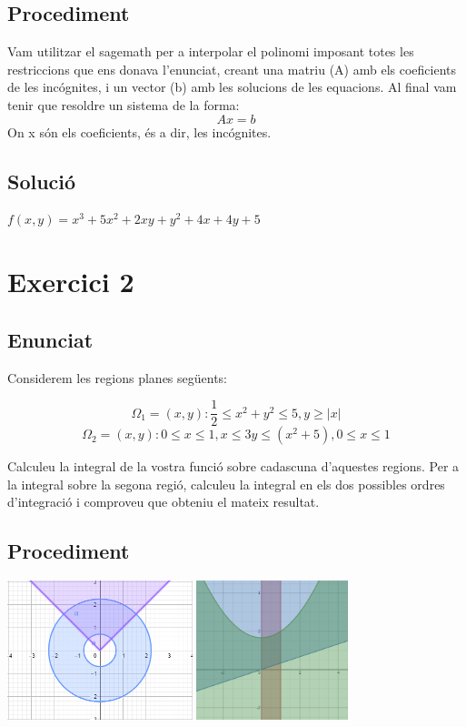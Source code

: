 \documentclass[12pt]{report}
\begin{document}
\section{Procediment}
Vam utilitzar el sagemath per a interpolar el polinomi imposant totes les restriccions que ens donava l'enunciat, creant una matriu (A) amb els coeficients de les incógnites, i un vector (b) amb les solucions de les equacions. 
\newline
Al final vam tenir que resoldre un sistema de la forma:
\[Ax = b \]
On x són els coeficients, és a dir, les incógnites.
\section{Solució}

\begin{center}
    $f(x, y) = x^{3}+5x^{2}+2xy+y^{2}+4x+4y+5$
\end{center}


\chapter{Exercici 2}
\section{Enunciat}
Considerem les regions planes següents:

\[ \Omega_1 = {(x,y) : \frac{1}{2} \le x^2 + y^2 \le 5, y \ge |x| }\]
\[ \Omega_2 = {(x,y) : 0 \le x \le 1, x \le 3y \le (x^2+5), 0\le x \le 1 }\]

Calculeu la integral de la vostra funció sobre cadascuna d'aquestes regions. Per a la integral sobre la segona regió, calculeu la integral en els dos possibles ordres d'integració i comproveu que obteniu el mateix resultat.
\newpage
\section{Procediment}
\begin{center}
    \includegraphics[width=0.404\textwidth]{regio_plana1.PNG}
    \label{$\Omega_1$}
    \includegraphics[width=0.33\textwidth]{regio_plana2.PNG}
\end{center}
\end{document}

